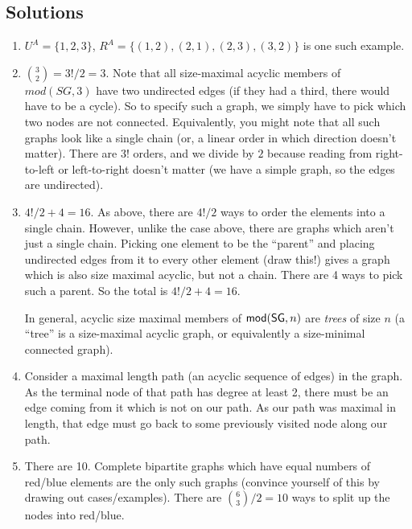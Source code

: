 \newpage
\begin{mdframed}[linewidth=1]
\section*{Solutions}
\begin{enumerate}
    \item $U^A = \{1, 2, 3\}$, $R^A = \{(1, 2), (2, 1), (2, 3), (3, 2)\}$ is one such example. 

    \item $\binom{3}{2} = 3!/2 = 3$. Note that all size-maximal acyclic members of $mod(SG, 3)$ have two undirected edges (if they had a third, there would have to be a cycle). So to specify such a graph, we simply have to pick which two nodes are not connected. Equivalently, you might note that all such graphs look like a single chain (or, a linear order in which direction doesn't matter). There are $3!$ orders, and we divide by $2$ because reading from right-to-left or left-to-right doesn't matter (we have a simple graph, so the edges are undirected). 

    \item $4!/2 + 4 = 16$. As above, there are $4!/2$ ways to order the elements into a single chain. However, unlike the case above, there are graphs which aren't just a single chain. Picking one element to be the ``parent'' and placing undirected edges from it to every other element (draw this!) gives a graph which is also size maximal acyclic, but not a chain. There are 4 ways to pick such a parent. So the total is $4!/2 + 4 = 16$. 

    In general, acyclic size maximal members of $\mbox{$\mathsf{mod}(\mbox{$\mathsf{SG}$},n)$}$ are \emph{trees} of size $n$ (a ``tree'' is a size-maximal acyclic graph, or equivalently a size-minimal connected graph).
    
    \item Consider a maximal length path (an acyclic sequence of edges) in the graph. As the terminal node of that path has degree at least 2, there must be an edge coming from it which is not on our path. As our path was maximal in length, that edge must go back to some previously visited node along our path.   
\iffalse 

    \item There are 10. Complete bipartite graphs which have equal numbers of red/blue elements are the only such graphs (convince yourself of this by drawing out cases/examples). There are $\binom{6}{3}/2 = 10$ ways to split up the nodes into red/blue.


\end{enumerate}
\end{mdframed}
